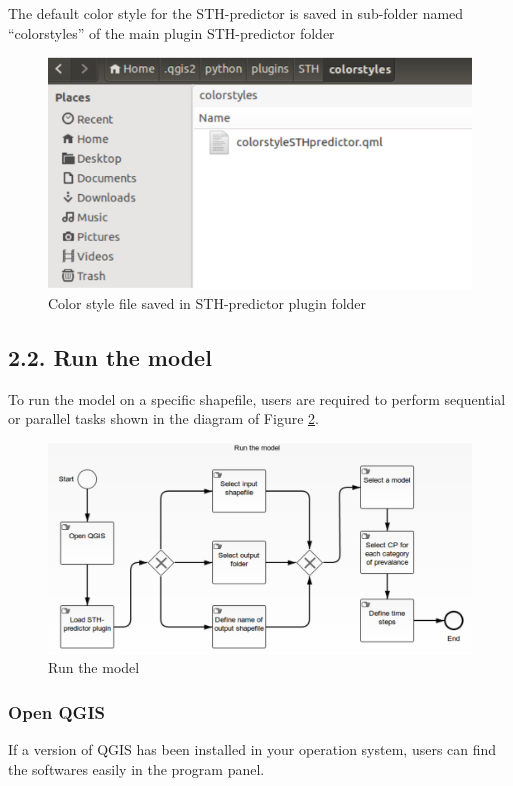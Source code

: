 \documentclass[12pt,oneside]{memoir}
\begin{document}
\begin{itemize}
The default color style for the STH-predictor is saved in sub-folder named ``colorstyles'' of the main plugin STH-predictor folder
\begin{figure}[H]
\centering
\includegraphics[scale=0.5]{colorstylefolder} 
\caption{Color style file saved in STH-predictor plugin folder} 
\label{colorstylefolder}
\end{figure}

\end{itemize}


\subsection{2.2. Run the model}
To run the model on a specific shapefile, users are required to perform sequential or parallel tasks shown in the diagram of Figure \ref{runmodel}. 
\begin{figure}[H]
\centering
\includegraphics[scale=0.6]{runmodel} 
\caption{Run the model} 
\label{runmodel}
\end{figure}

\subsubsection{Open QGIS}
If a version of QGIS has been installed in your operation system, users can find the softwares easily in the program panel.
\end{document}
